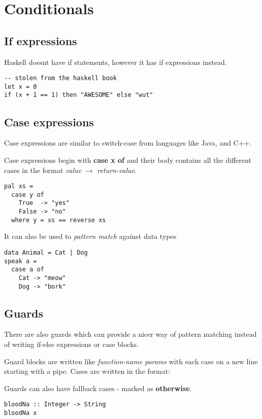 \section{Conditionals}
\subsection{If expressions}
Haskell doesnt have if statements, however it has if expressions instead.

\begin{lstlisting}
-- stolen from the haskell book
let x = 0
if (x + 1 == 1) then "AWESOME" else "wut"
\end{lstlisting}

\subsection{Case expressions}
Case expressions are similar to switch-case from languages like Java, and C++.

Case expressions begin with \textbf{case x of} and their body contains all the different
cases in the format \emph{value} $\rightarrow$ \emph{return-value}.

\begin{lstlisting}
pal xs =
  case y of
    True  -> "yes"
    False -> "no"
  where y = xs == reverse xs
\end{lstlisting}

It can also be used to \emph{pattern match} against data types
\begin{lstlisting}
data Animal = Cat | Dog
speak a =
  case a of
    Cat -> "meow"
    Dog -> "bork"
\end{lstlisting}

\newpage
\subsection{Guards}
There are also guards which can provide a nicer way of pattern matching instead of writing if-else expressions
or case blocks.

Guard blocks are written like \emph{function-name} \emph{params} with each case on
a new line starting with a pipe. Cases are written in the format:


Guards can also have fallback cases - marked as \textbf{otherwise}.

\begin{lstlisting}
bloodNa :: Integer -> String
bloodNa x

\end{lstlisting}


